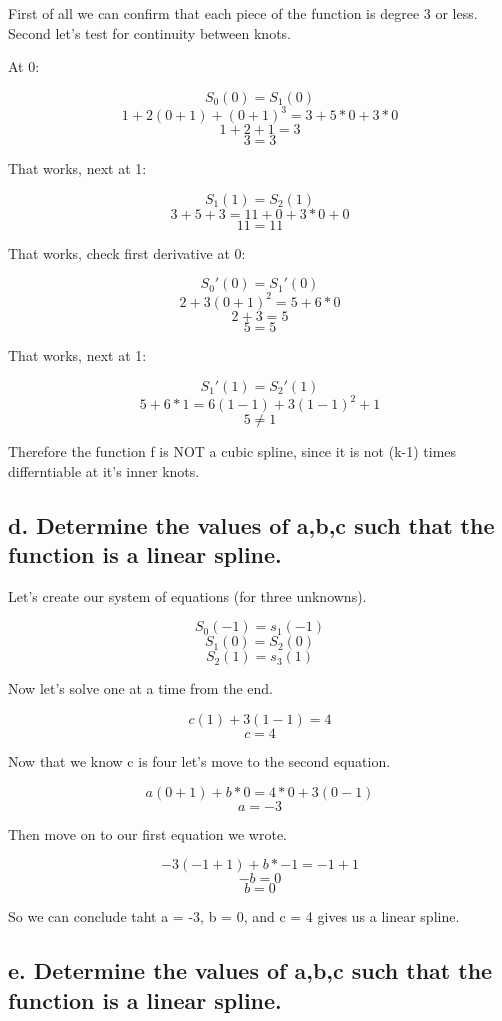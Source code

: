 \documentclass[]{article}
\begin{document}
First of all we can confirm that each piece of the function is degree 3
or less. Second let's test for continuity between knots.

At 0:

\[S_0(0) = S_1(0)\] \[1 + 2(0+1) + (0+1)^3=3+5*0+3*0\] \[1 + 2 + 1 = 3\]
\[3 = 3\]

That works, next at 1:

\[S_1(1) = S_2(1)\] \[3 + 5 + 3 = 11 + 0 + 3 * 0 + 0\] \[11 = 11\]

That works, check first derivative at 0:

\[S_0'(0) = S_1'(0)\] \[2+3(0+1)^2=5 + 6 * 0\] \[2 + 3 = 5\] \[5 = 5\]

That works, next at 1:

\[S_1'(1) = S_2'(1)\] \[5 + 6 * 1 = 6(1-1)+3(1-1)^2+1\] \[5 \ne 1\]

Therefore the function f is NOT a cubic spline, since it is not (k-1)
times differntiable at it's inner knots.

\subsection{d. Determine the values of a,b,c such that the function is a
linear
spline.}\label{d.-determine-the-values-of-abc-such-that-the-function-is-a-linear-spline.}

Let's create our system of equations (for three unknowns).

\[S_0(-1) = s_1(-1)\] \[S_1(0) = S_2(0)\] \[S_2(1) = s_3(1)\]

Now let's solve one at a time from the end.

\[c(1) + 3(1-1) = 4\] \[c = 4\]

Now that we know c is four let's move to the second equation.

\[a(0 + 1) + b * 0 = 4 * 0 + 3(0-1)\] \[a = -3\]

Then move on to our first equation we wrote.

\[-3(-1 + 1) + b * -1 = -1 + 1\] \[-b = 0\] \[b = 0\]

So we can conclude taht a = -3, b = 0, and c = 4 gives us a linear
spline.

\subsection{e. Determine the values of a,b,c such that the function is a
linear
spline.}\label{e.-determine-the-values-of-abc-such-that-the-function-is-a-linear-spline.}
\end{document}
